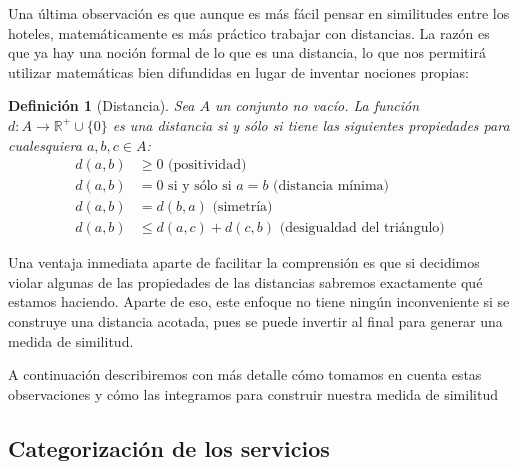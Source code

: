 \documentclass[12pt]{report}
\newcommand{\R}{\mathbb{R}}
\newtheorem{defn}{Definici\'on}[chapter]
\begin{document}
Una última observación es que aunque es más fácil pensar en similitudes entre los hoteles, matemáticamente es más práctico trabajar con distancias. La razón es que ya hay una noción formal de lo que es una distancia, lo que nos permitirá utilizar matemáticas bien difundidas en lugar de inventar nociones propias:
\begin{defn}[Distancia]
Sea $A$ un conjunto no vacío. La función $d: A \to \R^+ \cup \{0\}$ es una distancia si y sólo si tiene las siguientes propiedades para cualesquiera $a, b, c \in A$:
\begin{align}
	d(a,b) &\geq 0 \text{ (positividad)}\label{dpos}\\
	d(a,b) &= 0 \text{ si y sólo si } a = b \text{ (distancia mínima)}\label{dmin}\\
	d(a,b) &= d(b,a) \text{ (simetría)}\label{dsim}\\
	d(a,b) &\leq d(a,c) + d(c,b) \text{ (desigualdad del triángulo)}\label{dtri}
\end{align}
\end{defn}
Una ventaja inmediata aparte de facilitar la comprensión es que si decidimos violar algunas de las propiedades de las distancias sabremos exactamente qué estamos haciendo. Aparte de eso, este enfoque no tiene ningún inconveniente si se construye una distancia acotada, pues se puede invertir al final para generar una medida de similitud. 

A continuación describiremos con más detalle cómo tomamos en cuenta estas observaciones y cómo las integramos para construir nuestra medida de similitud

\subsection*{Categorización de los servicios}
\end{document}
